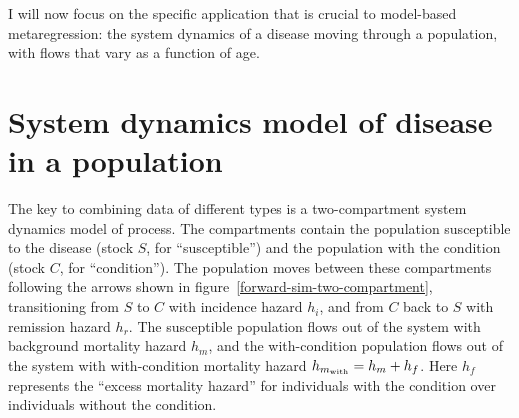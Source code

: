 








I will now focus on the specific application that is crucial to
model-based metaregression: the system dynamics of a disease moving
through a population, with flows that vary as a function of age.

\section{System dynamics model of disease in a population}
\label{sys-dynamics}
The key to combining data of different types is a two-compartment
system dynamics model of process. The compartments contain the
population susceptible to the disease (stock $S$, for ``susceptible'')
and the population with the condition (stock $C$, for
``condition''). The population moves between these compartments
following the arrows shown in
figure~\ref{forward-sim-two-compartment}, transitioning from $S$ to
$C$ with incidence hazard $h_i$, and from $C$ back to $S$ with
remission hazard $h_r$. The susceptible population flows out of the
system with background mortality hazard $h_m$, and the with-condition
population flows out of the system with with-condition mortality
hazard $h_{m_{\text{with}}} = h_m+h_f$.  Here $h_f$ represents the ``excess
mortality hazard'' for individuals with the condition over individuals
without the condition.

